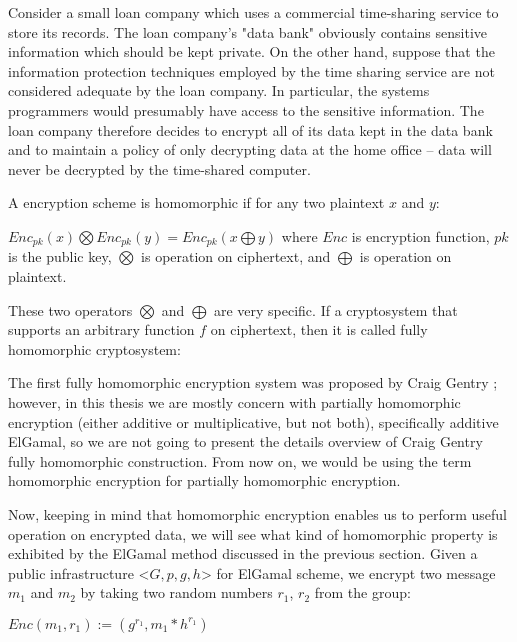 \begin{enumerate}
\begin{displayquote}
	     Consider a small loan company which uses a commercial time-sharing service to store its records.  
	     The loan company’s "data bank" obviously contains sensitive information which should be kept private.  
	     On the other hand, suppose that the information protection techniques employed by the time sharing 
	     service are not considered adequate by the loan company.  In particular, the systems programmers would 
	     presumably have access to the sensitive information.  The loan company therefore decides to encrypt all 
	     of its data kept in the data bank and to maintain a policy of only decrypting data at the home office -- data 
	     will never be decrypted by the time-shared computer.
	     
	     \end{displayquote}  
	     
		A encryption scheme is homomorphic if for any two plaintext $x$ and $y$:
		\begin{displayquote}
		
		 $Enc_{pk}(x) \bigotimes Enc_{pk}(y) = Enc_{pk} (x \bigoplus y)$  where 
		$Enc$ is encryption function, $pk$ is the public key, $\bigotimes$ is operation on ciphertext, and $\bigoplus$
		 is operation on plaintext.
		
		\end{displayquote}
				
		These two operators $\bigotimes$ and $\bigoplus$ are very specific. If a cryptosystem that supports an arbitrary 
		function $f$ on ciphertext, then it is called fully homomorphic cryptosystem:
		\begin{displayquote}
		  $ f (Enc_{pk}(m_{1}), Enc_{pk}(m_{2}), ..., Enc_[pk}(m_{k}) = Enc_{pk}( f (m_{1}, m_{2}, ..., m_{k}))$ 
	    \end{displayquote}
		
		\noindent
		The first fully homomorphic encryption system was proposed by Craig Gentry \citep{Gentry:2009:FHE:1834954}; however, 
		in this thesis we are mostly concern with partially homomorphic encryption (either additive or multiplicative, but not both),
		specifically additive ElGamal, 
		so we are not going to present the details overview 
		of Craig Gentry fully homomorphic construction. From now on, we would be using the term homomorphic encryption for 
		partially homomorphic encryption. 
		 	    
	    
	    
	    
	     
	    Now, keeping in mind that homomorphic encryption enables us to perform useful operation on encrypted data, 
	    we will see what kind of homomorphic property is exhibited by the ElGamal method discussed in the previous section. 
	    Given a public infrastructure <$G, p, g, h$> for ElGamal scheme, 
	     we encrypt two message $m_{1}$ and $m_{2}$ by taking two random numbers $r_{1}$,  $r_{2}$ from the group:
	     \begin{displayquote}
	     $Enc(m_{1}, r_{1}) := (g^{r_{1}}, m_{1} *  h^{r_{1}})$ 
	      \end{displayquote}
	     

\end{enumerate}
